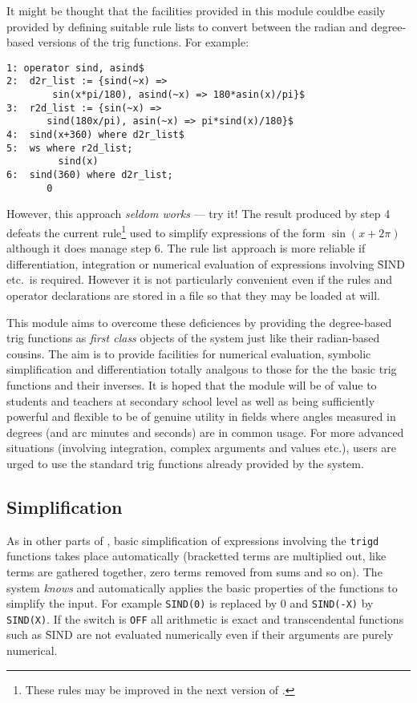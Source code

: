 It might be thought that the facilities provided in this module couldbe easily provided by defining suitable rule lists to convert between the radian and degree-based versions of the trig functions.  For example:
\begin{verbatim}
1: operator sind, asind$
2:  d2r_list := {sind(~x) =>
        sin(x*pi/180), asind(~x) => 180*asin(x)/pi}$ 
3:  r2d_list := {sin(~x) => 
       sind(180x/pi), asin(~x) => pi*sind(x)/180}$
4:  sind(x+360) where d2r_list$
5:  ws where r2d_list;
         sind(x)
6:  sind(360) where d2r_list;
       0
\end{verbatim}

However, this approach \emph{seldom works} --- try it! The result produced by step 4 defeats the current rule\footnote{These rules may be improved in the next version of {\REDUCE}.} 
used to simplify expressions of the form $\sin(x+2\pi)$  although it does manage step 6.  
The rule list approach is more reliable if differentiation, integration or numerical evaluation of expressions involving \f{SIND} etc.\  is required.  However it is not particularly convenient even if the rules  and operator declarations are stored in a file so that they may be loaded at will.

This module aims to overcome these deficiences by providing the degree-based trig  functions as \emph{first class} objects of the system just like their radian-based cousins. The aim is to provide facilities for numerical evaluation, symbolic simplification and differentiation totally analgous to those for the the basic trig functions and their inverses.  It is hoped that the module will be of value to students and teachers at secondary school level as well as being sufficiently powerful and flexible to be of genuine utility in fields where angles measured in degrees (and  arc minutes and seconds) are in common usage.  For more advanced situations (involving integration, complex arguments and values etc.),  users are urged to use the standard trig  functions already provided by the system.

\subsection{Simplification}
As in other parts of {\REDUCE}, basic simplification of expressions involving the \texttt{trigd} functions takes place automatically (bracketted terms are multiplied out, like terms are gathered together, zero terms removed from sums and so on).  The system \textit{knows} and automatically applies the basic properties of the functions to simplify the input.   For example \texttt{SIND(0)} is replaced by 0 and \texttt{SIND(-X)} by \texttt{SIND(X)}.  If the switch  is \texttt{OFF} all arithmetic is exact and transcendental functions  such as \f{SIND} are not evaluated numerically even if their arguments are purely numerical.

